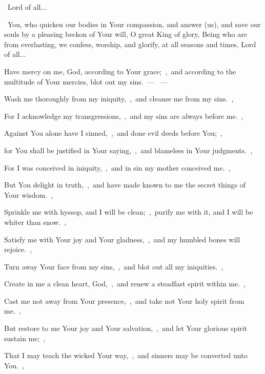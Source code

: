 \documentclass[12pt,twoside,a5paper]{article}
\begin{document}
\rr~Lord of all...


\cc~You, who quicken our bodies in Your compassion, and answer (us), and save our souls by a pleasing beckon of Your will, O great King of glory, Being who are from everlasting, we confess, worship, and glorify, at all seasons and times, Lord of all...



\begin{halfparskip}
  Have mercy on me, God, according to Your grace;~\sep\ and according to the multitude of Your mercies, blot out my sins.~--- ~--- 

  Wash me thoroughly from my iniquity,~\sep\ and cleanse me from my sins.~\sep

  For I acknowledge my transgressions,~\sep\ and my sins are always before me.~\sep

  Against You alone have I sinned,~\sep\ and done evil deeds before You;~\sep

  for You shall be justified in Your saying,~\sep\ and blameless in Your judgments.~\sep

  For I was conceived in iniquity,~\sep\ and in sin my mother conceived me.~\sep

  But You delight in truth,~\sep\ and have made known to me the secret things of Your wisdom.~\sep

  Sprinkle me with hyssop, and I will be clean;~\sep\ purify me with it, and I will be whiter than snow.~\sep

  Satisfy me with Your joy and Your gladness,~\sep\ and my humbled bones will rejoice.~\sep

  Turn away Your face from my sins,~\sep\ and blot out all my iniquities.~\sep

  Create in me a clean heart, God,~\sep\ and renew a steadfast spirit within me.~\sep

  Cast me not away from Your presence,~\sep\ and take not Your holy spirit from me.~\sep

  But restore to me Your joy and Your salvation,~\sep\ and let Your glorious spirit sustain me;~\sep

  That I may teach the wicked Your way,~\sep\ and sinners may be converted unto You.~\sep


\end{halfparskip}
\end{document}
